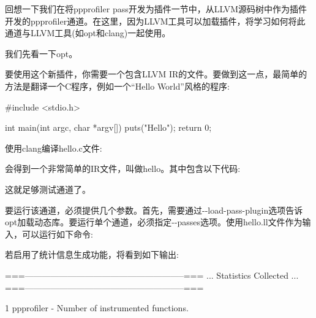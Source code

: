 回想一下我们在将ppprofiler pass开发为插件一节中，从LLVM源码树中作为插件开发的ppprofiler通道。在这里，因为LLVM工具可以加载插件，将学习如何将此通道与LLVM工具(如opt和clang)一起使用。

我们先看一下opt。


要使用这个新插件，你需要一个包含LLVM IR的文件。要做到这一点，最简单的方法是翻译一个C程序，例如一个“Hello World”风格的程序:

\begin{cpp}
#include <stdio.h>

int main(int argc, char *argv[]) {
    puts("Hello");
    return 0;
}
\end{cpp}

使用clang编译hello.c文件:


会得到一个非常简单的IR文件，叫做hello。其中包含以下代码:


这就足够测试通道了。

要运行该通道，必须提供几个参数。首先，需要通过-{}-load-pass-plugin选项告诉opt加载动态库。要运行单个通道，必须指定-{}-passes选项。使用hello.ll文件作为输入，可以运行如下命令:


若启用了统计信息生成功能，将看到如下输出:

\begin{shell}
===--------------------------------------------------------===
... Statistics Collected ...
===--------------------------------------------------------===

1 ppprofiler - Number of instrumented functions.
\end{shell}

